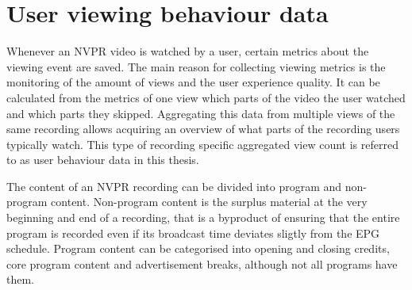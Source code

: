 \section{User viewing behaviour data} \label{sec:data} %

Whenever an NVPR video is watched by a user, certain metrics about the viewing event are saved. The main reason for collecting viewing metrics is the monitoring of the amount of views and the user experience quality. It can be calculated from the metrics of one view which parts of the video the user watched and which parts they skipped. Aggregating this data from multiple views of the same recording allows acquiring an overview of what parts of the recording users typically watch. This type of recording specific aggregated view count is referred to as user behaviour data in this thesis.

The content of an NVPR recording can be divided into program and non-program content. %
Non-program content is the surplus material at the very beginning and end of a recording, that is a byproduct of ensuring that the entire program is recorded even if its broadcast time deviates sligtly from the EPG schedule. Program content can be categorised into opening and closing credits, core program content and advertisement breaks, although not all programs have them.


